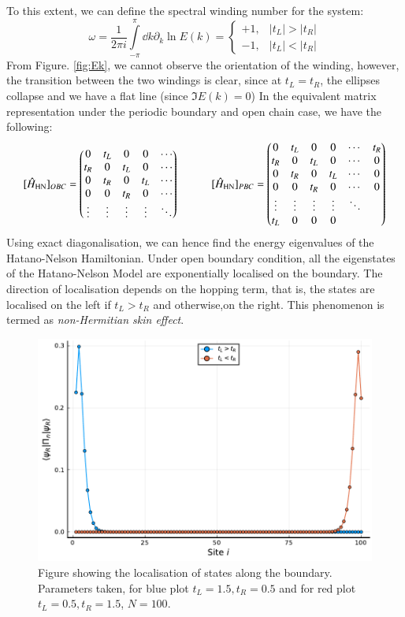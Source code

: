 To this extent, we can define the spectral winding number for the system:
$$\omega = \frac{1}{2\pi i}\int\limits_{-\pi}^{\pi}\dd k \partial_k \ln E(k) = \begin{cases}
    +1, & |t_L|>|t_R|\\
    -1, & |t_L|<|t_R|
\end{cases}$$
From Figure. \ref{fig:Ek}, we cannot observe the orientation of the winding, however, the transition between the two windings is clear, since at $t_L=t_R$, the ellipses collapse and we have a flat line (since $\Im E(k) = 0$)
In the equivalent matrix representation under the periodic boundary and open chain case, we have the following:
\[
[{\hat H}_{\rm{HN}}]_{OBC} = 
\begin{pmatrix}
0 & t_L& 0 & 0 &\cdots\\
t_R& 0& t_L& 0 &\cdots\\
0 & t_R & 0& t_L &\cdots\\
0 & 0 & t_R& 0& \cdots\\
\vdots& \vdots& \vdots& \vdots &\ddots
\end{pmatrix} \qquad \quad  
[{\hat H}_{\rm{HN}}]_{PBC} = 
\begin{pmatrix}
0 & t_L& 0 & 0 &\cdots &t_R\\
t_R& 0& t_L& 0 &\cdots & 0\\
0 & t_R & 0& t_L &\cdots &0\\
0 & 0 & t_R& 0& \cdots &0\\
\vdots& \vdots& \vdots& \vdots &\ddots \\
t_L & 0 &0&0
\end{pmatrix}
\]
Using exact diagonalisation, we can hence find the energy eigenvalues of the Hatano-Nelson Hamiltonian. Under open boundary condition, all the eigenstates of the Hatano-Nelson Model are exponentially localised on the boundary. The direction of localisation depends on the hopping term, that is, the states are localised on the left if $t_L>t_R$ and otherwise,on the right. This phenomenon is termed as \textit{non-Hermitian skin effect}.
\begin{figure}[H]
    \centering
    \includegraphics[scale=0.4]{FIGS_MANUS_NHSE/HN_skin.pdf} 
    \caption{Figure showing the localisation of states along the boundary. Parameters taken, for blue plot $t_L =1.5, t_R=0.5$ and for red plot  $t_L =0.5, t_R=1.5$, $N=100$.}
\end{figure}
